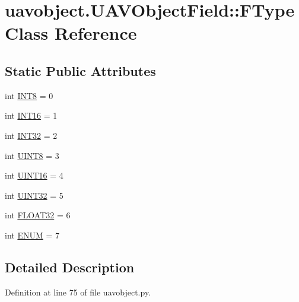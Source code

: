 \hypertarget{classuavobject_1_1_u_a_v_object_field_1_1_f_type}{\section{uavobject.\-U\-A\-V\-Object\-Field\-:\-:\-F\-Type \-Class \-Reference}
\label{classuavobject_1_1_u_a_v_object_field_1_1_f_type}
}
\subsection*{\-Static \-Public \-Attributes}
\begin{DoxyCompactItemize}
\item 
int \hyperlink{classuavobject_1_1_u_a_v_object_field_1_1_f_type_af926b1b994b6458f1c7da310f50488b0}{\-I\-N\-T8} = 0
\item 
int \hyperlink{classuavobject_1_1_u_a_v_object_field_1_1_f_type_a31e8284a6738fd76967ca831494a0aca}{\-I\-N\-T16} = 1
\item 
int \hyperlink{classuavobject_1_1_u_a_v_object_field_1_1_f_type_a4fd3782a98865e5ea790e3793cd39982}{\-I\-N\-T32} = 2
\item 
int \hyperlink{classuavobject_1_1_u_a_v_object_field_1_1_f_type_a25effac9bf8655551f13307d0fe57409}{\-U\-I\-N\-T8} = 3
\item 
int \hyperlink{classuavobject_1_1_u_a_v_object_field_1_1_f_type_a727b26f4ed04d856651d36166ba5e3d7}{\-U\-I\-N\-T16} = 4
\item 
int \hyperlink{classuavobject_1_1_u_a_v_object_field_1_1_f_type_afcf08fbf67c651d9b551ffc4c15c200e}{\-U\-I\-N\-T32} = 5
\item 
int \hyperlink{classuavobject_1_1_u_a_v_object_field_1_1_f_type_a88bb9b6066331e0e8154b975f2b1fb82}{\-F\-L\-O\-A\-T32} = 6
\item 
int \hyperlink{classuavobject_1_1_u_a_v_object_field_1_1_f_type_a1a2f10017b2d1012290b02ed02f6cef7}{\-E\-N\-U\-M} = 7
\end{DoxyCompactItemize}


\subsection{\-Detailed \-Description}


\-Definition at line 75 of file uavobject.\-py.



